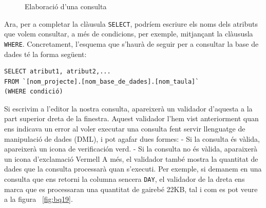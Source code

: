 \documentclass[12pt,longbibliography]{article}
\theoremstyle{definition}
\theoremstyle{remark}
\begin{document}
\vspace{2mm}
\begin{figure}[h!]
\par
{}%
\hfill
{}%
\par

\caption{Elaboració d'una consulta}
\label{fig:bq14}
\end{figure}
\vspace{2mm}

Ara, per a completar la clàusula \verb|SELECT|, podríem escriure els noms dels atributs que volem consultar, a més de condicions, per exemple, mitjançant la clàususla \verb|WHERE|. Concretament, l'esquema que s'haurà de seguir per a consultar la base de dades té la forma següent:


\begin{verbatim}
SELECT atribut1, atribut2,...
FROM `[nom_projecte].[nom_base_de_dades].[nom_taula]`
(WHERE condició)
\end{verbatim}

\vspace{2mm}

Si escrivim a l’editor la nostra consulta, apareixerà un validador d’aquesta a la part superior dreta de la finestra. Aquest validador l'hem vist anteriorment quan ens indicava un error al voler executar una consulta fent servir llenguatge de manipulació de dades (DML), i pot agafar dues formes:
- Si la consulta és vàlida, apareixerà un icona de verificación verd.
- Si la consulta no és vàlida, aparaixerà un icona d’exclamació Vermell
A més, el validador també mostra la quantitat de dades que la consulta processarà quan s’executi. Per exemple, si demanem en una consulta que ens retorni la columna sencera \verb|DAY|, el validador de la dreta ens marca que es processaran una quantitat de gairebé 22KB, tal i com es pot veure a la figura ~\ref{fig:bq19}.
\end{document}

